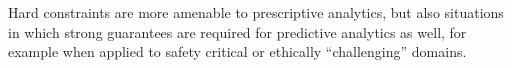 %
Hard constraints are more amenable to prescriptive analytics, but also situations in which strong guarantees are required for predictive analytics as well, for example when applied to safety critical or ethically ``challenging'' domains.
%
%
%
%
%

